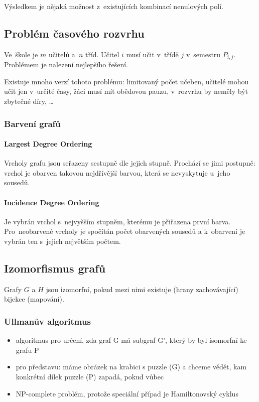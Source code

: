 Výsledkem je nějaká možnost z~existujících kombinací nenulových polí.

\subsection{Problém časového rozvrhu}

Ve~škole je $m$ učitelů a~$n$ tříd.
Učitel $i$ musí učit v~třídě $j$ v~semestru $P_{i,j}$.
Problémem je nalezení nejlepšího řešení.

Existuje mnoho verzí tohoto problému:
limitovaný počet učeben,
učitelé mohou učit jen v~určité časy,
žáci musí mít obědovou pauzu,
v~rozvrhu by neměly být zbytečné díry,
\dots

\subsubsection{Barvení grafů}

\paragraph{Largest Degree Ordering}

Vrcholy grafu jsou seřazeny sestupně dle jejich stupně.
Prochází se jimi postupně: vrchol je obarven takovou nejdřívější barvou, která se nevyskytuje u~jeho sousedů.

\paragraph{Incidence Degree Ordering}

Je vybrán vrchol s~nejvyšším stupněm, kterému je přiřazena první barva.
Pro~neobarvené vrcholy je spočítán počet obarvených sousedů a k~obarvení je vybrán ten s~jejich největším počtem.

\subsection{Izomorfismus grafů}

Grafy $G$ a $H$ jsou izomorfní, pokud mezi nimi existuje (hrany zachovávající) bijekce (mapování).


\subsubsection{Ullmanův algoritmus}
\begin{itemize}
    \item algoritmus pro určení, zda graf G má subgraf G', který by byl isomorfní ke grafu P
    \item pro představu: máme obrázek na krabici s puzzle (G) a chceme vědět, kam konkrétní dílek puzzle (P) zapadá, pokud vůbec
    \item NP-complete problém, protože speciální případ je Hamiltonovský cyklus
\end{itemize}

